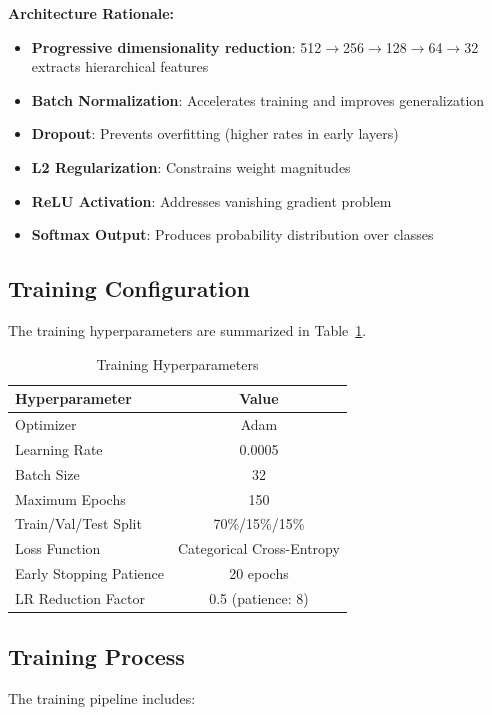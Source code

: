 \documentclass[conference]{IEEEtran}
\begin{document}
\textbf{Architecture Rationale:}
\begin{itemize}
    \item \textbf{Progressive dimensionality reduction}: 512$\rightarrow$256$\rightarrow$128$\rightarrow$64$\rightarrow$32 extracts hierarchical features
    \item \textbf{Batch Normalization}: Accelerates training and improves generalization
    \item \textbf{Dropout}: Prevents overfitting (higher rates in early layers)
    \item \textbf{L2 Regularization}: Constrains weight magnitudes
    \item \textbf{ReLU Activation}: Addresses vanishing gradient problem
    \item \textbf{Softmax Output}: Produces probability distribution over classes
\end{itemize}

\subsection{Training Configuration}

The training hyperparameters are summarized in Table~\ref{tab:hyperparams}.

\begin{table}[htbp]
\caption{Training Hyperparameters}
\label{tab:hyperparams}
\centering
\begin{tabular}{|l|c|}
\hline
\textbf{Hyperparameter} & \textbf{Value} \\
\hline
Optimizer & Adam \\
Learning Rate & 0.0005 \\
Batch Size & 32 \\
Maximum Epochs & 150 \\
Train/Val/Test Split & 70\%/15\%/15\% \\
Loss Function & Categorical Cross-Entropy \\
Early Stopping Patience & 20 epochs \\
LR Reduction Factor & 0.5 (patience: 8) \\
\hline
\end{tabular}
\end{table}

\subsection{Training Process}

The training pipeline includes:
\end{document}
